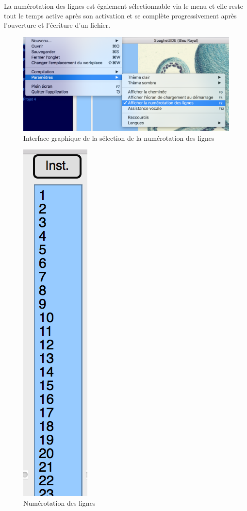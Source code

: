 \documentclass[a4paper,12pt]{article}
\begin{document}
La numérotation des lignes est également sélectionnable via le menu et elle reste tout le temps active après son activation et se complète progressivement après l'ouverture et l'écriture d'un fichier.

\begin{figure}[h!]
			\begin{center}
				\includegraphics[scale=0.5]{images/selection_numerote_lines.png}
				\caption{Interface graphique de la sélection de la numérotation des lignes}
			\end{center}
		\end{figure}
		
\begin{figure}[h!]
			\begin{center}
				\includegraphics[scale=0.6]{images/numerote_lines.png}
				\caption{Numérotation des lignes}
			\end{center}
		\end{figure}
		
\end{document}
